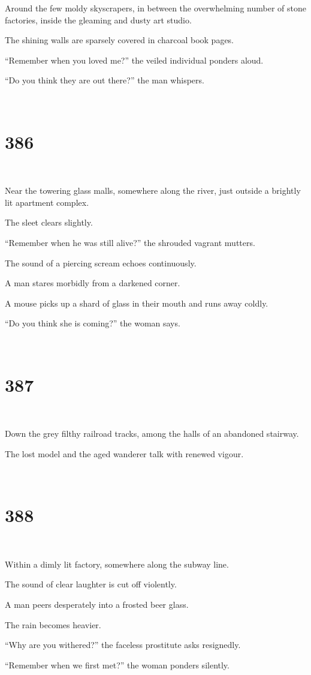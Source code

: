 \documentclass{report}
\begin{document}
Around the few moldy skyscrapers, in between the overwhelming number of stone factories, inside the gleaming and dusty art studio.

The shining walls are sparsely covered in charcoal book pages.

``Remember when you loved me?'' the veiled individual ponders aloud.

``Do you think they are out there?'' the man whispers.

~
\chapter*{386}
~

Near the towering glass malls, somewhere along the river, just outside a brightly lit apartment complex.

The sleet clears slightly.

``Remember when he was still alive?'' the shrouded vagrant mutters.

The sound of a piercing scream echoes continuously.

A man stares morbidly from a darkened corner.

A mouse picks up a shard of glass in their mouth and runs away coldly.

``Do you think she is coming?'' the woman says.

~
\chapter*{387}
~

Down the grey filthy railroad tracks, among the halls of an abandoned stairway.

The lost model and the aged wanderer talk with renewed vigour.

~
\chapter*{388}
~

Within a dimly lit factory, somewhere along the subway line.

The sound of clear laughter is cut off violently.

A man peers desperately into a frosted beer glass.

The rain becomes heavier.

``Why are you withered?'' the faceless prostitute asks resignedly.

``Remember when we first met?'' the woman ponders silently.
\end{document}

